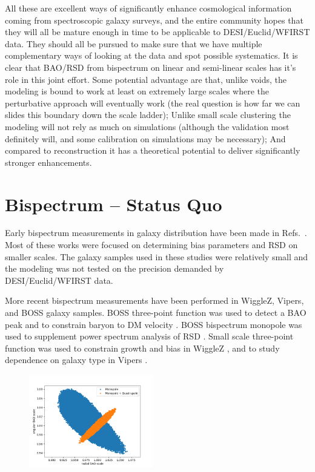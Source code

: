 All these are excellent ways of significantly enhance cosmological information
coming from spectroscopic galaxy surveys, and the entire community hopes that
they will all be mature enough in time to be applicable to DESI/Euclid/WFIRST
data.  They should all be pursued to make sure that we have multiple
complementary ways of looking at the data and spot possible systematics. It is
clear that BAO/RSD from bispectrum on linear and semi-linear scales has it's
role in this joint effort. Some potential advantage are that, unlike voids, the
modeling is bound to work at least on extremely large scales where the
perturbative approach will eventually work (the real question is how far we can
slides this boundary down the scale ladder); Unlike small scale clustering the
modeling will not rely as much on simulations (although the validation most
definitely will, and some calibration on simulations may be necessary); And
compared to reconstruction it has a theoretical potential to deliver
significantly stronger enhancements.

\section{Bispectrum -- Status Quo}
\label{sec:statusquo}
Early bispectrum measurements in galaxy distribution have been made in
Refs.~\cite{2014ApJ...780..139G,2011ApJ...739...85M,2011ApJ...726...13M,2009MNRAS.399..801G,2007MNRAS.378.1196K,2006MNRAS.368.1507N,2005MNRAS.364..620G,2005MNRAS.361..824G,2004PASJ...56..415K,2004ApJ...607..140J,2002MNRAS.335..432V,1975ApJ...196....1P}.
Most of these works were focused on determining bias parameters and RSD on
smaller scales. The galaxy samples used in these studies were relatively small
and the modeling was not tested on the precision demanded by DESI/Euclid/WFIRST
data.

More recent bispectrum measurements have been performed in WiggleZ, Vipers, and
BOSS galaxy samples. BOSS three-point function was used to detect a BAO peak
\cite{2017MNRAS.469.1738S} and to constrain baryon to DM velocity
\cite{2016arXiv160706098S}. BOSS bispectrum monopole was used to supplement
power spectrum analysis of RSD
\cite{2017MNRAS.465.1757G,2015MNRAS.452.1914G,2015MNRAS.451..539G}. Small scale
three-point function was used to constrain growth and bias in WiggleZ
\cite{2013MNRAS.432.2654M}, and to study dependence on galaxy type in Vipers
\cite{2017A&A...604A.133M}.

\begin{figure}
\begin{center}
\includegraphics[width=0.48\textwidth]{prelimMCMC.png}
\end{center}
\end{figure}

